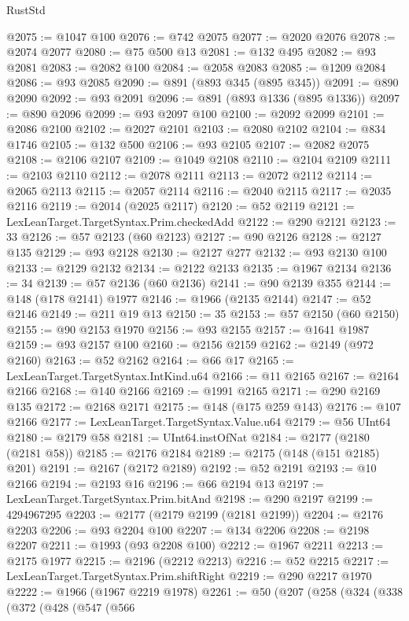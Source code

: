 \begin{lexlean}{RustStd}
\begin{coremodule}
@2075 := @1047 @100
@2076 := @742 @2075
@2077 := @2020 @2076
@2078 := @2074 @2077
@2080 := @75 @500 @13
@2081 := @132 @495
@2082 := @93 @2081
@2083 := @2082 @100
@2084 := @2058 @2083
@2085 := @1209 @2084
@2086 := @93 @2085
@2090 := @891 (@893 @345 (@895 @345))
@2091 := @890 @2090
@2092 := @93 @2091
@2096 := @891 (@893 @1336 (@895 @1336))
@2097 := @890 @2096
@2099 := @93 @2097 @100
@2100 := @2092 @2099
@2101 := @2086 @2100
@2102 := @2027 @2101
@2103 := @2080 @2102
@2104 := @834 @1746
@2105 := @132 @500
@2106 := @93 @2105
@2107 := @2082 @2075
@2108 := @2106 @2107
@2109 := @1049 @2108
@2110 := @2104 @2109
@2111 := @2103 @2110
@2112 := @2078 @2111
@2113 := @2072 @2112
@2114 := @2065 @2113
@2115 := @2057 @2114
@2116 := @2040 @2115
@2117 := @2035 @2116
@2119 := @2014 (@2025 @2117)
@2120 := @52 @2119
@2121 := LexLeanTarget.TargetSyntax.Prim.checkedAdd
@2122 := @290 @2121
@2123 := 33
@2126 := @57 @2123 (@60 @2123)
@2127 := @90 @2126
@2128 := @2127 @135
@2129 := @93 @2128
@2130 := @2127 @277
@2132 := @93 @2130 @100
@2133 := @2129 @2132
@2134 := @2122 @2133
@2135 := @1967 @2134
@2136 := 34
@2139 := @57 @2136 (@60 @2136)
@2141 := @90 @2139 @355
@2144 := @148 (@178 @2141) @1977
@2146 := @1966 (@2135 @2144)
@2147 := @52 @2146
@2149 := @211 @19 @13
@2150 := 35
@2153 := @57 @2150 (@60 @2150)
@2155 := @90 @2153 @1970
@2156 := @93 @2155
@2157 := @1641 @1987
@2159 := @93 @2157 @100
@2160 := @2156 @2159
@2162 := @2149 (@972 @2160)
@2163 := @52 @2162
@2164 := @66 @17
@2165 := LexLeanTarget.TargetSyntax.IntKind.u64
@2166 := @11 @2165
@2167 := @2164 @2166
@2168 := @140 @2166
@2169 := @1991 @2165
@2171 := @290 @2169 @135
@2172 := @2168 @2171
@2175 := @148 (@175 @259 @143)
@2176 := @107 @2166
@2177 := LexLeanTarget.TargetSyntax.Value.u64
@2179 := @56 UInt64
@2180 := @2179 @58
@2181 := UInt64.instOfNat
@2184 := @2177 (@2180 (@2181 @58))
@2185 := @2176 @2184
@2189 := @2175 (@148 (@151 @2185) @201)
@2191 := @2167 (@2172 @2189)
@2192 := @52 @2191
@2193 := @10 @2166
@2194 := @2193 @16
@2196 := @66 @2194 @13
@2197 := LexLeanTarget.TargetSyntax.Prim.bitAnd
@2198 := @290 @2197
@2199 := 4294967295
@2203 := @2177 (@2179 @2199 (@2181 @2199))
@2204 := @2176 @2203
@2206 := @93 @2204 @100
@2207 := @134 @2206
@2208 := @2198 @2207
@2211 := @1993 (@93 @2208 @100)
@2212 := @1967 @2211
@2213 := @2175 @1977
@2215 := @2196 (@2212 @2213)
@2216 := @52 @2215
@2217 := LexLeanTarget.TargetSyntax.Prim.shiftRight
@2219 := @290 @2217 @1970
@2222 := @1966 (@1967 @2219 @1978)
@2261 := @50
    (@207
      (@258
        (@324
          (@338
            (@372
              (@428
                (@547
                  (@566

\end{coremodule}
\end{lexlean}
